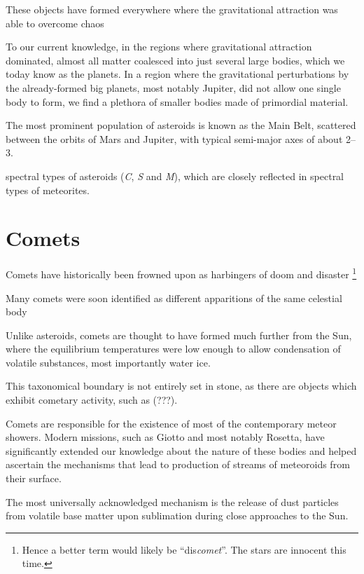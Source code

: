     These objects have formed everywhere where the gravitational attraction was able to overcome chaos \citep{???}

    To our current knowledge, in the regions where gravitational attraction dominated, almost all matter
    coalesced into just several large bodies, which we today know as the planets.
    In a region where the gravitational perturbations by the already-formed big planets, most notably Jupiter,
    did not allow one single body to form, we find a plethora of smaller bodies made of primordial material.

    The most prominent population of asteroids is known as the Main Belt, scattered between the orbits
    of Mars and Jupiter, with typical semi-major axes of about \SIrange{2}{3}{\au}.

    spectral types of asteroids (\emph{C}, \emph{S} and \emph{M}), which are closely reflected in
    spectral types of meteorites.



\section{Comets} \label{ac}
    Comets have historically been frowned upon as harbingers of doom and disaster%
    \footnote{Hence a better term would likely be ``dis\textit{comet}''. The stars are innocent this time.}

    Many comets were soon identified as different apparitions of the same celestial body 

    Unlike asteroids, comets are thought to have formed much further from the Sun, where the equilibrium
    temperatures were low enough to allow condensation of volatile substances, most importantly water ice.

    This taxonomical boundary is not entirely set in stone, as there are objects which exhibit
    cometary activity, such as (???). 

    Comets are responsible for the existence of most of the contemporary meteor showers.
    Modern missions, such as Giotto and most notably Rosetta, have significantly extended our knowledge
    about the nature of these bodies and helped ascertain the mechanisms that lead to production
    of streams of meteoroids from their surface.

    The most universally acknowledged mechanism is the release of dust particles from
    volatile base matter upon sublimation during close approaches to the Sun.

